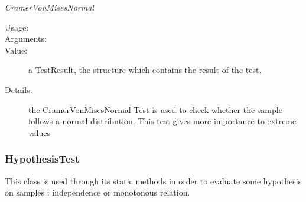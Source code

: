\begin{description}
\begin{description}
\item \textit{CramerVonMisesNormal}
\begin{description}
\item[Usage:] \rule{0pt}{1em}
\item[Arguments:] \rule{0pt}{1em}
\item[Value:]  a TestResult, the structure which contains the result of the test.
\item[Details:] the CramerVonMisesNormal Test is used to check whether the sample follows a normal distribution. This test gives more importance to extreme values
\end{description}
\end{description}

\end{description}




\newpage
\subsubsection{HypothesisTest}

This class is used through its static methods in order to evaluate some hypothesis on samples : independence or monotonous relation.

